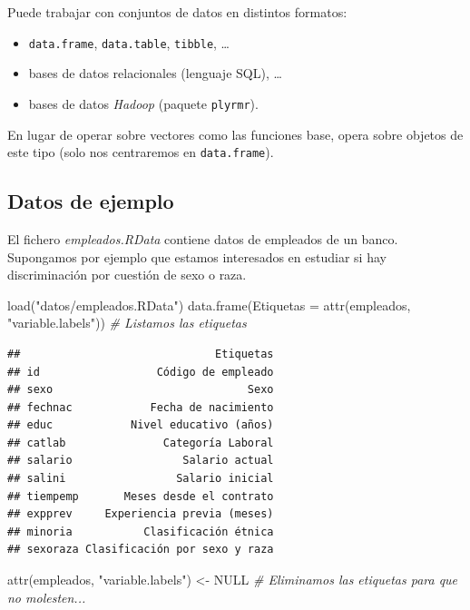 \documentclass[
]{book}
\newenvironment{Shaded}{\begin{snugshade}}{\end{snugshade}}
\newcommand{\AttributeTok}[1]{\textcolor[rgb]{0.77,0.63,0.00}{#1}}
\newcommand{\CommentTok}[1]{\textcolor[rgb]{0.56,0.35,0.01}{\textit{#1}}}
\newcommand{\ConstantTok}[1]{\textcolor[rgb]{0.00,0.00,0.00}{#1}}
\newcommand{\FunctionTok}[1]{\textcolor[rgb]{0.00,0.00,0.00}{#1}}
\newcommand{\NormalTok}[1]{#1}
\newcommand{\OtherTok}[1]{\textcolor[rgb]{0.56,0.35,0.01}{#1}}
\newcommand{\StringTok}[1]{\textcolor[rgb]{0.31,0.60,0.02}{#1}}
\providecommand{\tightlist}{%
  \setlength{\itemsep}{0pt}\setlength{\parskip}{0pt}}
\theoremstyle{break}
\theoremstyle{nonumberplain}
\begin{document}
Puede trabajar con conjuntos de datos en distintos formatos:

\begin{itemize}
\tightlist
\item
  \texttt{data.frame}, \texttt{data.table}, \texttt{tibble}, \ldots{}
\item
  bases de datos relacionales (lenguaje SQL), \ldots{}
\item
  bases de datos \emph{Hadoop} (paquete \texttt{plyrmr}).
\end{itemize}

En lugar de operar sobre vectores como las funciones base,
opera sobre objetos de este tipo (solo nos centraremos en \texttt{data.frame}).

\hypertarget{datos-de-ejemplo-1}{%
\subsection{Datos de ejemplo}\label{datos-de-ejemplo-1}}

El fichero \emph{empleados.RData} contiene datos de empleados de un banco.
Supongamos por ejemplo que estamos interesados en estudiar si hay
discriminación por cuestión de sexo o raza.

\begin{Shaded}
\begin{Highlighting}[]
\FunctionTok{load}\NormalTok{(}\StringTok{"datos/empleados.RData"}\NormalTok{)}
\FunctionTok{data.frame}\NormalTok{(}\AttributeTok{Etiquetas =} \FunctionTok{attr}\NormalTok{(empleados, }\StringTok{"variable.labels"}\NormalTok{))  }\CommentTok{\# Listamos las etiquetas}
\end{Highlighting}
\end{Shaded}

\begin{verbatim}
##                              Etiquetas
## id                  Código de empleado
## sexo                              Sexo
## fechnac            Fecha de nacimiento
## educ            Nivel educativo (años)
## catlab               Categoría Laboral
## salario                 Salario actual
## salini                 Salario inicial
## tiempemp       Meses desde el contrato
## expprev     Experiencia previa (meses)
## minoria           Clasificación étnica
## sexoraza Clasificación por sexo y raza
\end{verbatim}

\begin{Shaded}
\begin{Highlighting}[]
\FunctionTok{attr}\NormalTok{(empleados, }\StringTok{"variable.labels"}\NormalTok{) }\OtherTok{\textless{}{-}} \ConstantTok{NULL}                  \CommentTok{\# Eliminamos las etiquetas para que no molesten...}
\end{Highlighting}
\end{Shaded}
\end{document}
